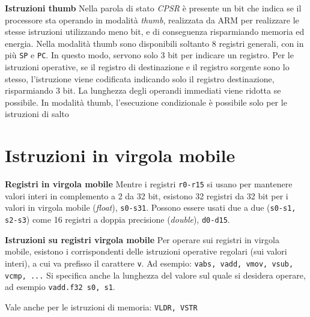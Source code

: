 \begin{defn}
    \textbf{Istruzioni thumb}
    Nella parola di stato \textit{CPSR} è presente un bit che indica se il processore
    sta operando in modalità \textit{thumb}, realizzata da ARM per realizzare le stesse istruzioni utilizzando meno bit,
    e di conseguenza risparmiando memoria ed energia.
    Nella modalità thumb sono disponibili soltanto 8 registri generali, con in più \texttt{SP} e \texttt{PC}.
    In questo modo, servono solo 3 bit per indicare un registro.
    Per le istruzioni operative, se il registro di destinazione e il registro sorgente sono lo stesso,
    l'istruzione viene codificata indicando solo il registro destinazione, risparmiando 3 bit.
    La lunghezza degli operandi immediati viene ridotta se possibile.
    In modalità thumb, l'esecuzione condizionale è possibile solo per le istruzioni di salto

\end{defn}

\section{Istruzioni in virgola mobile}

\begin{defn}
    \textbf{Registri in virgola mobile}
    Mentre i registri \texttt{r0-r15} si usano per mantenere valori interi in complemento a 2 da 32 bit,
    esistono 32 registri da 32 bit per i valori in virgola mobile (\textit{float}), \texttt{s0-s31}.
    Possono essere usati due a due (\texttt{s0-s1, s2-s3}) come 16 registri a doppia precisione (\textit{double}), \texttt{d0-d15}.
\end{defn}

\begin{defn}
    \textbf{Istruzioni su registri virgola mobile}
    Per operare sui registri in virgola mobile, esistono i corrispondenti delle istruzioni
    operative regolari (sui valori interi), a cui va prefisso il carattere \texttt{v}.
    Ad esempio: \texttt{vabs, vadd, vmov, vsub, vcmp, ...}
    Si specifica anche la lunghezza del valore sul quale si desidera operare, ad
    esempio \texttt{vadd.f32 s0, s1}.


    Vale anche per le istruzioni di memoria: \texttt{VLDR, VSTR}
\end{defn}


